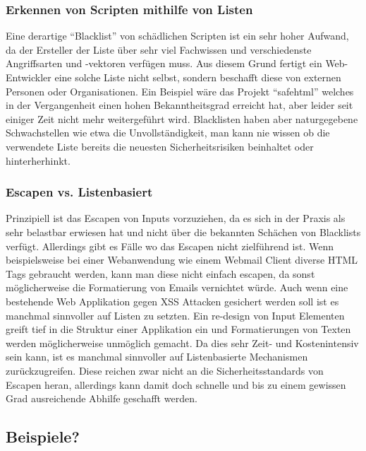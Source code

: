 \subsubsection{Erkennen von Scripten mithilfe von Listen}
Eine derartige ``Blacklist'' von sch\"adlichen Scripten ist ein sehr hoher Aufwand, da der Ersteller der Liste \"uber sehr viel Fachwissen und verschiedenste Angriffsarten und -vektoren verf\"ugen muss. Aus diesem Grund fertigt ein Web-Entwickler eine solche Liste nicht selbst, sondern beschafft diese von externen Personen oder Organisationen. Ein Beispiel w\"are das Projekt ``safehtml'' welches in der Vergangenheit einen hohen Bekanntheitsgrad erreicht hat, aber leider seit einiger Zeit nicht mehr weitergef\"uhrt wird. Blacklisten haben aber naturgegebene Schwachstellen wie etwa die Unvollst\"andigkeit, man kann nie wissen ob die verwendete Liste bereits die neuesten Sicherheitsrisiken beinhaltet oder hinterherhinkt.

\subsubsection{Escapen vs. Listenbasiert}
Prinzipiell ist das Escapen von Inputs vorzuziehen, da es sich in der Praxis als sehr belastbar erwiesen hat und nicht \"uber die bekannten Sch\"achen von Blacklists verf\"ugt. Allerdings gibt es F\"alle wo das Escapen nicht zielf\"uhrend ist. Wenn beispielsweise bei einer Webanwendung wie einem Webmail Client diverse HTML Tags gebraucht werden, kann man diese nicht einfach escapen, da sonst m\"oglicherweise die Formatierung von Emails vernichtet w\"urde. Auch wenn eine bestehende Web Applikation gegen XSS Attacken gesichert werden soll ist es manchmal sinnvoller auf Listen zu setzten. Ein re-design von Input Elementen greift tief in die Struktur einer Applikation ein und Formatierungen von Texten werden m\"oglicherweise unm\"oglich gemacht. Da dies sehr Zeit- und Kostenintensiv sein kann, ist es manchmal sinnvoller auf Listenbasierte Mechanismen zur\"uckzugreifen. Diese reichen zwar nicht an die Sicherheitsstandards von Escapen heran, allerdings kann damit doch schnelle und bis zu einem gewissen Grad ausreichende Abhilfe geschafft werden.
\cite{xssBuch}

\subsection{Beispiele?}
